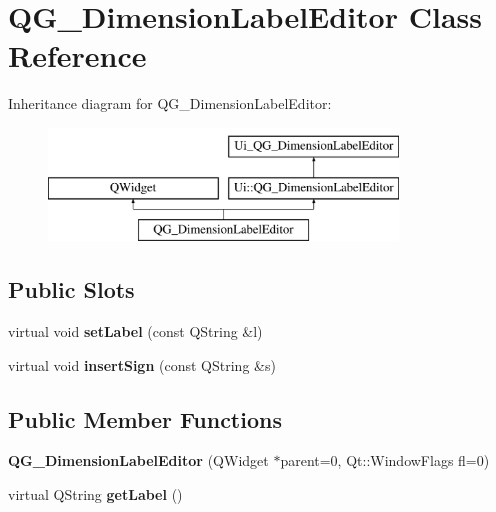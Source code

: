 \hypertarget{classQG__DimensionLabelEditor}{\section{Q\-G\-\_\-\-Dimension\-Label\-Editor Class Reference}
\label{classQG__DimensionLabelEditor}
}
Inheritance diagram for Q\-G\-\_\-\-Dimension\-Label\-Editor\-:\begin{figure}[H]
\begin{center}
\leavevmode
\includegraphics[height=3.000000cm]{classQG__DimensionLabelEditor}
\end{center}
\end{figure}
\subsection*{Public Slots}
\begin{DoxyCompactItemize}
\item 
\hypertarget{classQG__DimensionLabelEditor_a3919f92d972b62f4ca39dfb2ae60edae}{virtual void {\bfseries set\-Label} (const Q\-String \&l)}\label{classQG__DimensionLabelEditor_a3919f92d972b62f4ca39dfb2ae60edae}

\item 
\hypertarget{classQG__DimensionLabelEditor_aec1f3ff2a1e449e391437178edf9d791}{virtual void {\bfseries insert\-Sign} (const Q\-String \&s)}\label{classQG__DimensionLabelEditor_aec1f3ff2a1e449e391437178edf9d791}

\end{DoxyCompactItemize}
\subsection*{Public Member Functions}
\begin{DoxyCompactItemize}
\item 
\hypertarget{classQG__DimensionLabelEditor_a129e35f95e5252e3ccc187c28f629013}{{\bfseries Q\-G\-\_\-\-Dimension\-Label\-Editor} (Q\-Widget $\ast$parent=0, Qt\-::\-Window\-Flags fl=0)}\label{classQG__DimensionLabelEditor_a129e35f95e5252e3ccc187c28f629013}

\item 
\hypertarget{classQG__DimensionLabelEditor_a9c3c7bfa4e4611798ddbb3eb23b50d84}{virtual Q\-String {\bfseries get\-Label} ()}\label{classQG__DimensionLabelEditor_a9c3c7bfa4e4611798ddbb3eb23b50d84}

\end{DoxyCompactItemize}
